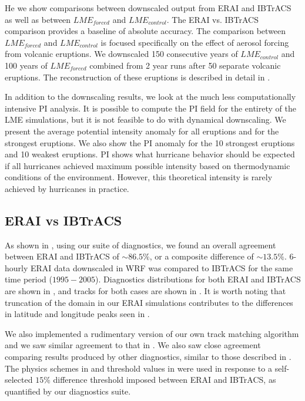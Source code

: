 \documentclass[phd,tocprelim]{cornell}
\begin{document}
He we show comparisons between downscaled output from ERAI and IBTrACS 
as well as between $LME_{forced}$ and $LME_{control}$. The ERAI vs. 
IBTrACS comparison provides a baseline of absolute accuracy. The 
comparison between $LME_{forced}$ and $LME_{control}$ is focused 
specifically on the effect of aerosol forcing from volcanic eruptions. 
We downscaled 150 consecutive years of $LME_{control}$ and 100 years 
of $LME_{forced}$ combined from 2 year runs after 50 separate volcanic 
eruptions. The reconstruction of these eruptions is described in detail 
in \cite{erups_recon}. 
\par
In addition to the downscaling results, we look at the much less 
computationally intensive PI analysis. It is possible to compute the 
PI field for the entirety of the LME simulations, but it is not feasible 
to do with dynamical downscaling. We present the average potential 
intensity anomaly for all eruptions and for the strongest eruptions. We 
also show the PI anomaly for the 10 strongest eruptions and 10 weakest 
eruptions. PI shows what hurricane behavior should be expected if all 
hurricanes achieved maximum possible intensity based on thermodynamic 
conditions of the environment. However, this theoretical intensity is 
rarely achieved by hurricanes in practice.

\subsection{ERAI vs IBTrACS}
As shown in , using our suite of diagnostics, we 
found an overall agreement between ERAI and IBTrACS of ${\sim}86.5\%$, or 
a composite difference of ${\sim}13.5\%$. $6$-hourly ERAI data downscaled 
in WRF was compared to IBTrACS for the same time period ($1995-2005$). 
Diagnostics distributions for both ERAI and IBTrACS are shown in 
, and tracks for both cases are shown in 
. It is worth noting that truncation of 
the domain in our ERAI simulations contributes to the differences in 
latitude and longitude peaks seen in .  
\par
We also implemented a rudimentary version of our own track matching 
algorithm and we saw similar agreement to that in \cite{hodges2017well}. 
We also saw close agreement comparing results produced by other 
diagnostics, similar to those described in . The physics 
schemes in  and threshold values in  
were used in response to a self-selected $15\%$ difference threshold 
imposed between ERAI and IBTrACS, as quantified by our diagnostics suite. 
\end{document}
